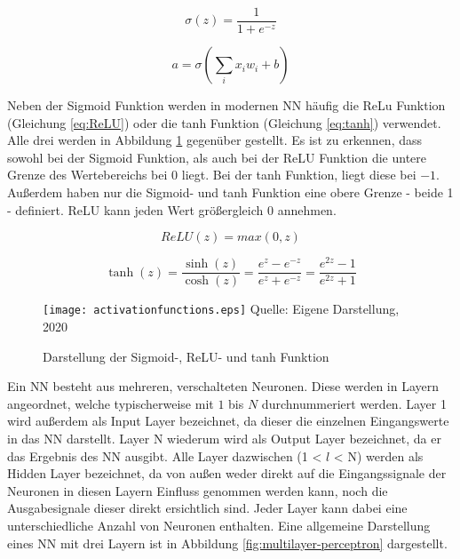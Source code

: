 \begin{equation} \label{eq:sigmoid}
    \sigma (z) =  \frac{1}{1+e^{-z}}
\end{equation}

\begin{equation} \label{eq:outputNeuron}
    a = \sigma (\sum_{i}{x_i w_i + b})
\end{equation}

Neben der Sigmoid Funktion werden in modernen \ac{NN} häufig die ReLu Funktion (Gleichung \ref{eq:ReLU}) oder die tanh Funktion (Gleichung \ref{eq:tanh}) verwendet. Alle drei werden in Abbildung \ref{fig:activationfunctions} gegenüber gestellt. Es ist zu erkennen, dass sowohl bei der Sigmoid Funktion, als auch bei der ReLU Funktion die untere Grenze des Wertebereichs bei $0$ liegt. Bei der tanh Funktion, liegt diese bei $-1$. Außerdem haben nur die Sigmoid- und tanh Funktion eine obere Grenze - beide 1 - definiert. ReLU kann jeden Wert größergleich $0$ annehmen.

\begin{equation} \label{eq:ReLU}
    ReLU(z) = max(0,z)
\end{equation}

\begin{equation} \label{eq:tanh}
    \tanh(z) = \frac{\sinh(z)}{\cosh(z)} = \frac {e^z - e^{-z}} {e^z + e^{-z}}
  = \frac{e^{2z} - 1} {e^{2z} + 1}
\end{equation}

\begin{figure}[t]
    \centering
    \caption[]{Darstellung der Sigmoid-, ReLU- und tanh Funktion}
	\label{fig:activationfunctions}
    \texttt{[image: activationfunctions.eps]}
    Quelle: Eigene Darstellung, 2020
\end{figure}

Ein \ac{NN} besteht aus mehreren, verschalteten Neuronen. Diese werden in Layern angeordnet, welche typischerweise mit $1$ bis $N$ durchnummeriert werden. Layer 1 wird außerdem als Input Layer bezeichnet, da dieser die einzelnen Eingangswerte in das \ac{NN} darstellt. Layer N wiederum wird als Output Layer bezeichnet, da er das Ergebnis des \ac{NN} ausgibt. Alle Layer dazwischen (1 < $l$ < N) werden als Hidden Layer bezeichnet, da von außen weder direkt auf die Eingangssignale der Neuronen in diesen Layern Einfluss genommen werden kann, noch die Ausgabesignale dieser direkt ersichtlich sind. Jeder Layer kann dabei eine unterschiedliche Anzahl von Neuronen enthalten. Eine allgemeine Darstellung eines \ac{NN} mit drei Layern ist in Abbildung \ref{fig:multilayer-perceptron} dargestellt.

